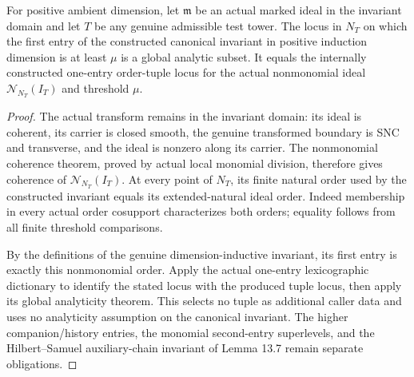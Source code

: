 \begin{theorem}
\label{hir:canonical-first-entry-analytic-superlevel}
\leanok
For positive ambient dimension, let $\mathfrak m$ be an actual marked
ideal in the invariant domain and let $T$ be any genuine admissible test
tower. The locus in $N_T$ on which the first entry of the constructed
canonical invariant in positive induction dimension is at least $\mu$
is a global analytic subset. It equals the internally constructed
one-entry order-tuple locus for the actual nonmonomial ideal
$\mathcal N_{N_T}(I_T)$ and threshold $\mu$.
\end{theorem}
\begin{proof}
The actual transform remains in the invariant domain: its ideal is
coherent, its carrier is closed smooth, the genuine transformed boundary
is SNC and transverse, and the ideal is nonzero along its carrier.
The nonmonomial coherence theorem, proved by actual local monomial
division, therefore gives coherence of $\mathcal N_{N_T}(I_T)$. At every
point of $N_T$, its finite natural order used by the constructed invariant
equals its extended-natural ideal order. Indeed membership in every
actual order cosupport characterizes both orders; equality follows from
all finite threshold comparisons.

By the definitions of the genuine dimension-inductive invariant, its
first entry is exactly this nonmonomial order. Apply the actual one-entry
lexicographic dictionary to identify the stated locus with the produced
tuple locus, then apply its global analyticity theorem. This selects no
tuple as additional caller data and uses no analyticity assumption on the
canonical invariant. The higher companion/history entries, the monomial
second-entry superlevels, and the Hilbert--Samuel auxiliary-chain invariant
of Lemma 13.7 remain separate obligations.
\end{proof}
